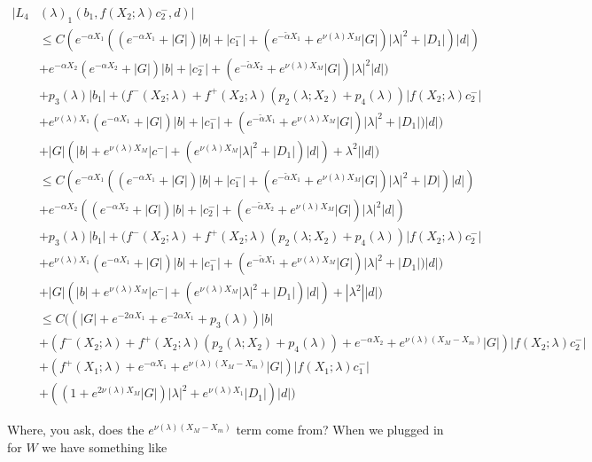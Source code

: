 \documentclass[12pt]{article}
\begin{document}
\begin{enumerate}
\begin{align*}
|L_4&(\lambda)_1(b_1, f(X_2; \lambda) c_2^-, d)|\\ 
&\leq C ( e^{-\alpha X_1}( (e^{-\alpha X_1} + |G|) |b| + |c_1^-| + (e^{-\tilde{\alpha} X_1} + e^{\nu(\lambda)X_M} |G|) |\lambda|^2 + |D_1|) |d| )\\
&+ e^{-\alpha X_2} (e^{-\alpha X_2} + |G|) |b| + |c_2^-| + (e^{-\tilde{\alpha} X_2} + e^{\nu(\lambda)X_M} |G|) |\lambda|^2 |d| ) \\
&+ p_3(\lambda) |b_1| + (f^-(X_2; \lambda) + f^+(X_2; \lambda) (p_2(\lambda; X_2) + p_4(\lambda)) | f(X_2; \lambda) c_2^-| \\
&+ e^{\nu(\lambda)X_1} (e^{-\alpha X_1} + |G|) |b| + |c_1^-| + (e^{-\tilde{\alpha} X_1} + e^{\nu(\lambda)X_M} |G|) |\lambda|^2 + |D_1|) |d| ) \\
&+ |G| (|b| + e^{\nu(\lambda)X_M}|c^-| + (e^{\nu(\lambda)X_M} |\lambda|^2 + |D_1|)|d| ) + \lambda^2||d|) \\
&\leq C ( e^{-\alpha X_1}( (e^{-\alpha X_1} + |G|) |b| + |c_1^-| + (e^{-\tilde{\alpha} X_1} + e^{\nu(\lambda)X_M} |G|) |\lambda|^2 + |D|) |d| )\\
&+ e^{-\alpha X_2} ((e^{-\alpha X_2} + |G|) |b| + |c_2^-| + (e^{-\tilde{\alpha} X_2} + e^{\nu(\lambda)X_M} |G|) |\lambda|^2 |d| ) \\
&+ p_3(\lambda) |b_1| + (f^-(X_2; \lambda) + f^+(X_2; \lambda) (p_2(\lambda; X_2) + p_4(\lambda)) | f(X_2; \lambda) c_2^-| \\
&+ e^{\nu(\lambda)X_1} (e^{-\alpha X_1} + |G|) |b| + |c_1^-| + (e^{-\tilde{\alpha} X_1} + e^{\nu(\lambda)X_M} |G|) |\lambda|^2 + |D_1|) |d| ) \\
&+ |G| (|b| + e^{\nu(\lambda)X_M}|c^-| + (e^{\nu(\lambda)X_M} |\lambda|^2 + |D_1|)|d| ) + |\lambda^2||d|) \\
&\leq C( (|G| + e^{-2\alpha X_1} + e^{-2\alpha X_1} + p_3(\lambda))|b| \\
&+ (f^-(X_2; \lambda) + f^+(X_2; \lambda) (p_2(\lambda; X_2) + p_4(\lambda)) + e^{-\alpha X_2} + e^{\nu(\lambda)(X_M - X_m)}|G|)| f(X_2; \lambda) c_2^-| \\
&+ (f^+(X_1; \lambda) + e^{-\alpha X_1} + e^{\nu(\lambda)(X_M - X_m)}|G|)| f(X_1; \lambda) c_1^-| \\
&+ ((1 + e^{2 \nu(\lambda) X_M }|G|)|\lambda|^2 + e^{\nu(\lambda)X_1}|D_1|)|d| )
\end{align*}

Where, you ask, does the $e^{\nu(\lambda)(X_M - X_m)}$ term come from? When we plugged in for $W$ we have something like


\end{enumerate}
\end{document}
